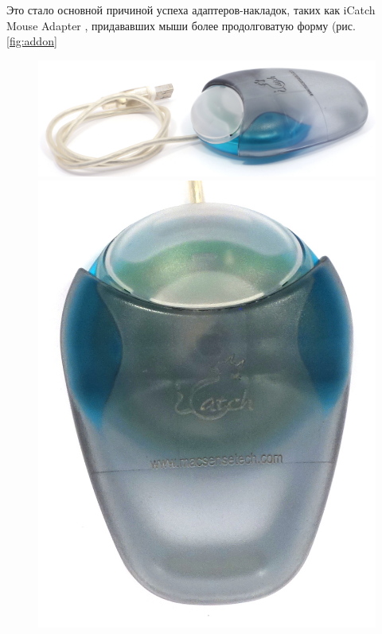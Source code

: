 \documentclass[11pt, a4paper]{article}
\begin{document}
Это стало основной причиной успеха адаптеров-накладок, таких как iCatch Mouse Adapter \cite{bib:icatch}, придававших мыши более продолговатую форму (рис. \ref{fig:addon}

\begin{figure}[h]
    \centering
    \includegraphics[scale=0.6]{1998_apple_puck/apple63.jpg}
    \includegraphics[scale=0.6]{1998_apple_puck/appleup63.JPG}

\end{figure}
\end{document}
